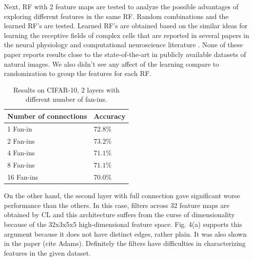 \documentclass{article} %
\begin{document}
Next, RF with 2 feature maps are tested to analyze the possible advantages of exploring different features in the same RF.
Random combinations and the learned RF's are tested.
Learned RF's are obtained  based on the similar ideas for learning the receptive fields of complex cells that are reported in 
several papers in the neural physiology and computational neuroscience literature \cite{masquelier2007learning,spratling2005learning,wiskott2002slow,wallis1997invariant}.
None of these paper reports results close to the state-of-the-art in publicly available datasets of natural images.
We also didn't see any affect of the learning compare to randomization to group the features for each RF.

\setlength{\tabcolsep}{10pt}

\begin{table}
\caption{Results on CIFAR-10, 2 layers with different number of fan-ins.}
\begin{centering}
\begin{tabular}{ll}
\multicolumn{1}{c}{\bf Number of connections}  &\multicolumn{1}{c}{\bf Accuracy}\\
\hline
1 Fan-in                                 &$72.8\%$\\
2 Fan-ins                           &$73.2\%$\\
4 Fan-ins                           &$71.1\%$ \\
8 Fan-ins                        &$71.1\%$\\
16 Fan-ins                           &$70.0\%$\\
\hline
\end{tabular}
\par %
\end{centering}

\end{table}

On the other hand, the second layer with full connection gave significant worse performance than the others.
In this case, filters across 32 feature maps are obtained by CL and this architecture suffers from the curse of dimensionality
because of the 32x3x5x5 high-dimensional feature space.
Fig. 4(a) supports this argument because it does not have distinct edges, rather plain.
It was also shown in the paper (cite Adams).
Definitely the filters have difficulties in characterizing features in the given dataset.
\end{document}
